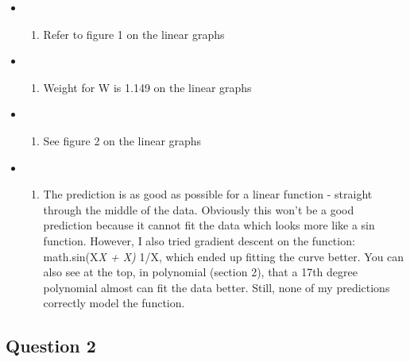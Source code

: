\documentclass[11pt]{article}
\providecommand{\tightlist}{%
      \setlength{\itemsep}{0pt}\setlength{\parskip}{0pt}}
\begin{document}
\begin{itemize}
\item
  \begin{enumerate}
  \def\labelenumi{\alph{enumi})}
  \tightlist
  \item
    Refer to figure 1 on the linear graphs
  \end{enumerate}
\item
  \begin{enumerate}
  \def\labelenumi{\alph{enumi})}
  \setcounter{enumi}{1}
  \tightlist
  \item
    Weight for W is 1.149 on the linear graphs
  \end{enumerate}
\item
  \begin{enumerate}
  \def\labelenumi{\alph{enumi})}
  \setcounter{enumi}{2}
  \tightlist
  \item
    See figure 2 on the linear graphs
  \end{enumerate}
\item
  \begin{enumerate}
  \def\labelenumi{\alph{enumi})}
  \setcounter{enumi}{3}
  \tightlist
  \item
    The prediction is as good as possible for a linear function -
    straight through the middle of the data. Obviously this won't be a
    good prediction because it cannot fit the data which looks more like
    a sin function. However, I also tried gradient descent on the
    function: math.sin(X\emph{X + X) } 1/X, which ended up fitting the
    curve better. You can also see at the top, in polynomial (section
    2), that a 17th degree polynomial almost can fit the data better.
    Still, none of my predictions correctly model the function.
  \end{enumerate}
\end{itemize}

    \subsection{Question 2}\label{question-2}
\end{document}
